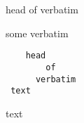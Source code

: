 \begin{myenv}
head of verbatim
\end{myenv}
some verbatim
\begin{verbatim}
    head
        of
      verbatim
 text
\end{verbatim}
text
